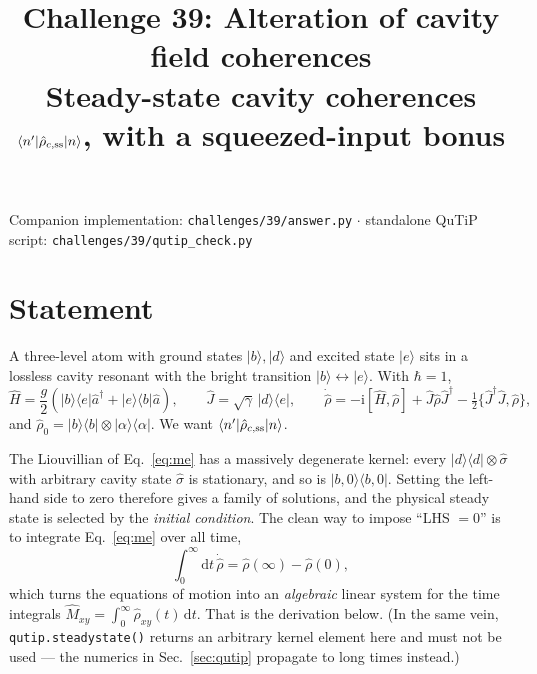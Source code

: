 \documentclass[11pt,a4paper]{article}
\title{\bfseries Challenge 39: Alteration of cavity field coherences\\[2pt]
\large Steady-state cavity coherences $\bra{n'}\hat\rho_{c,\rm ss}\ket{n}$,
with a squeezed-input bonus}
\author{}
\date{}
\newcommand{\ket}[1]{\lvert #1\rangle}
\newcommand{\bra}[1]{\langle #1\rvert}
\newcommand{\ketbra}[2]{\lvert #1\rangle\langle #2\rvert}
\newcommand{\ii}{\mathrm{i}}
\newcommand{\dd}{\mathrm{d}}
\begin{document}
\maketitle
\vspace{-2.2\baselineskip}

\begin{center}\small
Companion implementation: \texttt{challenges/39/answer.py} \quad$\cdot$\quad
standalone QuTiP script: \texttt{challenges/39/qutip\_check.py}
\end{center}

\section{Statement}

A three-level atom with ground states $\ket b,\ket d$ and excited state $\ket e$
sits in a lossless cavity resonant with the bright transition
$\ket b\!\leftrightarrow\!\ket e$.  With $\hbar=1$,
\begin{equation}
  \hat H=\frac{g}{2}\left(\ketbra{b}{e}\hat a^{\dagger}
                         +\ketbra{e}{b}\hat a\right),
  \qquad
  \hat J=\sqrt{\gamma}\,\ketbra{d}{e},
  \qquad
  \dot{\hat\rho}=-\ii[\hat H,\hat\rho]
  +\hat J\hat\rho\hat J^{\dagger}
  -\tfrac12\{\hat J^{\dagger}\hat J,\hat\rho\},
  \label{eq:me}
\end{equation}
and $\hat\rho_0=\ketbra{b}{b}\otimes\ketbra{\alpha}{\alpha}$.  We want
$\bra{n'}\hat\rho_{c,\rm ss}\ket{n}$.

\begin{tcolorbox}[colback=red!5,colframe=red!55!black,
  title=\textbf{Careful: $\mathcal L\hat\rho=0$ does not determine the answer}]
The Liouvillian of Eq.~\eqref{eq:me} has a massively degenerate kernel: every
$\ketbra{d}{d}\otimes\hat\sigma$ with arbitrary cavity state $\hat\sigma$ is
stationary, and so is $\ketbra{b,0}{b,0}$.  Setting the left-hand side to zero
therefore gives a family of solutions, and the physical steady state is
selected by the \emph{initial condition}.  The clean way to impose ``LHS
$=0$'' is to integrate Eq.~\eqref{eq:me} over all time,
\begin{equation}
  \int_0^{\infty}\!\dd t\,\dot{\hat\rho}=\hat\rho(\infty)-\hat\rho(0),
  \label{eq:integrate}
\end{equation}
which turns the equations of motion into an \emph{algebraic} linear system for
the time integrals $\hat M_{xy}=\int_0^{\infty}\hat\rho_{xy}(t)\,\dd t$.  That
is the derivation below.  (In the same vein, \texttt{qutip.steadystate()}
returns an arbitrary kernel element here and must not be used --- the numerics
in Sec.~\ref{sec:qutip} propagate to long times instead.)
\end{tcolorbox}
\end{document}
